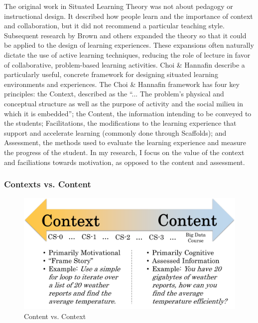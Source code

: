 The original work in Situated Learning Theory was not about pedagogy or instructional design. It described how people learn and the importance of context and collaboration, but it did not recommend a particular teaching style.
Subsequent research by Brown \cite{brown1989situated} and others expanded the theory so that it could be applied to the design of learning experiences.
These expansions often naturally dictate the use of active learning techniques, reducing the role of lecture in favor of collaborative, problem-based learning activities.
Choi \& Hannafin \cite{situated-cognition} describe a particularly useful, concrete framework for designing situated learning environments and experiences.
The Choi \& Hannafin framework has four key principles: the Context, described as the ``... The problem's physical and conceptual structure as well as the purpose of activity and the social milieu in which it is embedded''\cite{rogoff1984everyday}; the Content, the information intending to be conveyed to the students; Facilitations, the modifications to the learning experience that support and accelerate learning (commonly done through Scaffolds); and Assessment, the methods used to evaluate the learning experience and measure the progress of the student.
In my research, I focus on the value of the context and faciliations towards motivation, as opposed to the content and assessment.
	
\subsubsection{Contexts vs. Content}

\begin{figure}
	\begin{center}
    \includegraphics[width=\linewidth]{images/content-context-2.png}
	\end{center}
	\caption{Content vs. Context}
	\label{fig-content-context}
\end{figure}

